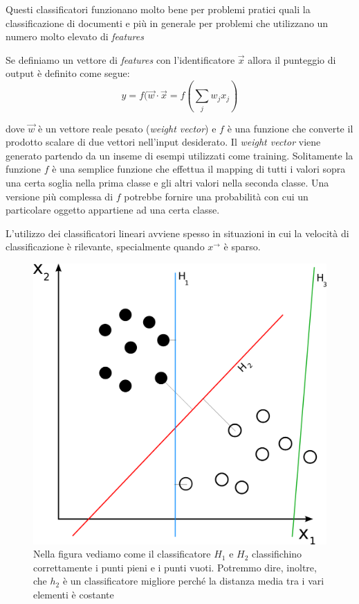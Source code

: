 \documentclass[a4paper,12pt,openright,twoside]{report}
\theoremstyle{definition}
\begin{document}
Questi classificatori funzionano molto bene per problemi pratici quali la classificazione di 
documenti e più in generale per problemi che utilizzano un numero molto elevato di \emph{features}

Se definiamo un vettore di \emph{features} con l'identificatore $\vec{x}$ allora il punteggio di output
è definito come segue:
\begin{equation}
	y=f(\vec{w} \cdot \vec{x} = f (\sum_j w_jx_j)
	\label{output score}
\end{equation}

dove $\vec{w}$ è un vettore reale pesato (\emph{weight vector}) e $f$ è una 
funzione che converte il prodotto scalare di due vettori nell'input desiderato.
Il \emph{weight vector} viene generato partendo da un inseme di esempi utilizzati come training. Solitamente
la funzione $f$ è una semplice funzione
che effettua il mapping di tutti i valori sopra una certa soglia nella prima classe e gli altri valori nella
seconda classe. Una versione più complessa di $f$ potrebbe fornire una probabilità con cui un particolare
oggetto appartiene ad una certa classe.

L'utilizzo dei classificatori lineari avviene spesso in situazioni in cui la velocità di classificazione
è rilevante, specialmente quando $x^\rightarrow$ è sparso.
\begin{figure}[ht]
	\centering
	\includegraphics[scale=0.2]{Immagini/liblinear_esempio.png}
	\caption{Nella figura vediamo come il classificatore $H_1$ e $H_2$ classifichino
	correttamente i punti pieni e i punti vuoti. Potremmo dire, inoltre, che $h_2$
	è un classificatore migliore perché la distanza media tra i vari elementi è costante}
	\label{fig:liblinearEx}
\end{figure}
\end{document}
